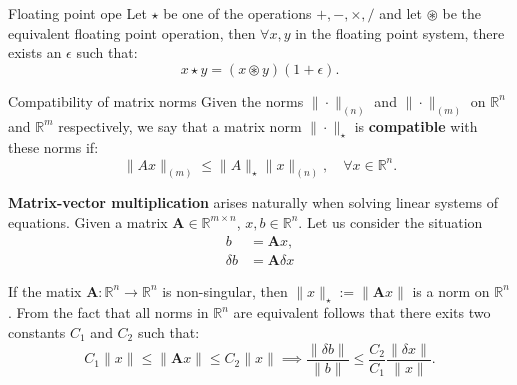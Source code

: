 \documentclass[12pt,a4paper]{book}
\newcommand {\R}{\mathbb{R}}
\newcommand {\1}{\textrm{\textbf{1}}}
\begin{document}
\begin{theorem}{Floating point ope}
    Let $\star$ be one of the operations $+, -, \times, /$ and let $\circledast$ be the equivalent floating point operation, then $\forall x, y$ in the floating point system, there exists an $\epsilon$ such that:
    \[
        x \star y = (x \circledast y)(1 + \epsilon).
    \]
\end{theorem}

\begin{definition}{Compatibility of matrix norms}
  Given the norms $\| \cdot \|_{(n)}$ and $\| \cdot \|_{(m)}$ on $\R^n$ and $\R^{m}$ respectively, we say that a matrix norm $\| \cdot \|_{\star}$ is \textbf{compatible} with these norms if:
  \[
      \| A x \|_{(m)} \leq \| A \|_{\star} \| x \|_{(n)}, \quad \forall x \in \R^n.
  \]
\end{definition}

\noindent \textbf{Matrix-vector multiplication} arises naturally when solving linear systems of equations. Given a matrix $\mathbf{A} \in \R^{m \times n}$, $x, b \in \R^n$. Let us consider the situation
\begin{align*}
    b &= \mathbf{A} x \text{,} \\
    \delta b &= \mathbf{A} \delta x
\end{align*}

\noindent If the matix $\mathbf{A}: \R^n \to \R^n$ is non-singular, then $\| x \|_{\star} := \| \mathbf{A} x \|$ is a norm on $\R^n$. From the fact that all norms 
in $\R^n$ are equivalent follows that there exits two constants $C_1$ and $C_2$ such that:\\
\[
    C_1 \| x \| \leq \|\mathbf{A} x\| \leq C_2 \| x \| \implies \frac{\| \delta b \|}{\| b \|} \leq \frac{C_2}{C_1} \frac{\| \delta x \|}{\| x \|}.
\]

\end{document}

